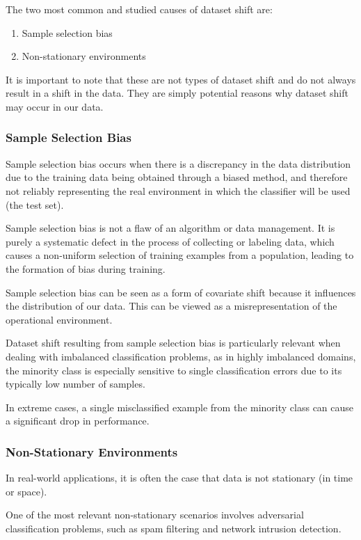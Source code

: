 The two most common and studied causes of dataset shift are:

\begin{enumerate}
\item Sample selection bias
\item Non-stationary environments
\end{enumerate}

It is important to note that these are not types of dataset shift and do not always result in a shift in the data. They are simply potential reasons why dataset shift may occur in our data.


\subsubsection{Sample Selection Bias}

Sample selection bias occurs when there is a discrepancy in the data distribution due to the training data being obtained through a biased method, and therefore not reliably representing the real environment in which the classifier will be used (the test set).

Sample selection bias is not a flaw of an algorithm or data management. It is purely a systematic defect in the process of collecting or labeling data, which causes a non-uniform selection of training examples from a population, leading to the formation of bias during training.

Sample selection bias can be seen as a form of covariate shift because it influences the distribution of our data. This can be viewed as a misrepresentation of the operational environment.

Dataset shift resulting from sample selection bias is particularly relevant when dealing with imbalanced classification problems, as in highly imbalanced domains, the minority class is especially sensitive to single classification errors due to its typically low number of samples.

In extreme cases, a single misclassified example from the minority class can cause a significant drop in performance.


\subsubsection{Non-Stationary Environments}

In real-world applications, it is often the case that data is not stationary (in time or space).

One of the most relevant non-stationary scenarios involves adversarial classification problems, such as spam filtering and network intrusion detection.

